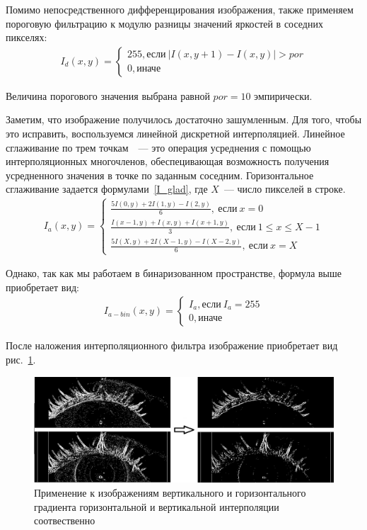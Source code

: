 \documentclass[12pt,a4paper]{article} %
\begin{document}
Помимо непосредственного дифференцирования изображения, также применяем пороговую фильтрацию к модулю разницы значений яркостей в соседних пикселях:
\begin{gather}\label{I_diff}
	 I_d(x,y) = \begin{cases}
	 	255, \text{если}~|I(x,y+1) - I(x,y)|> por
	 	\\
	 	0, \text{иначе}
	 \end{cases}
\end{gather}

Величина порогового значения выбрана равной $por=10$ эмпирически.

Заметим, что изображение получилось достаточно зашумленным. Для того, чтобы это исправить, воспользуемся линейной дискретной интерполяцией. Линейное сглаживание по трем точкам~\cite{Inter}~--- это операция усреднения с помощью интерполяционных многочленов, обеспецивающая возможность получения усредненного значения в точке по заданным соседним. Горизонтальное сглаживание задается формулами~\ref{I_glad}, где $X$~--- число пикселей в строке.
\begin{gather}\label{I_glad}
	I_a(x,y) = \begin{cases}
		\frac{5I(0,y)+2I(1,y)-I(2,y)}{6},~\text{если}~x=0
		\\
		\frac{I(x-1,y)+I(x,y)+I(x+1,y)}{3},~\text{если}~1\leq x\leq X-1
		\\
			\frac{5I(X,y)+2I(X-1,y)-I(X-2,y)}{6},~\text{если}~x=X
	\end{cases}
\end{gather}

Однако, так как мы работаем в бинаризованном пространстве, формула выше приобретает вид:
\begin{gather}\label{I_glad_bin}
	I_{a-bin}(x,y) = \begin{cases}
		I_a, \text{если}~I_a = 255
		\\
		0, \text{иначе}
	\end{cases}
\end{gather}

После наложения интерполяционного фильтра изображение приобретает вид рис.~\ref{fig:I_glad}.

\begin{figure}[h]
	
	\centering
	
	\includegraphics[width=0.8\linewidth]{I_glad.jpg}
	
	\caption{Применение к изображениям вертикального и горизонтального градиента горизонтальной и вертикальной интерполяции соотвественно}
	
	\label{fig:I_glad}
	
\end{figure}
\end{document}
